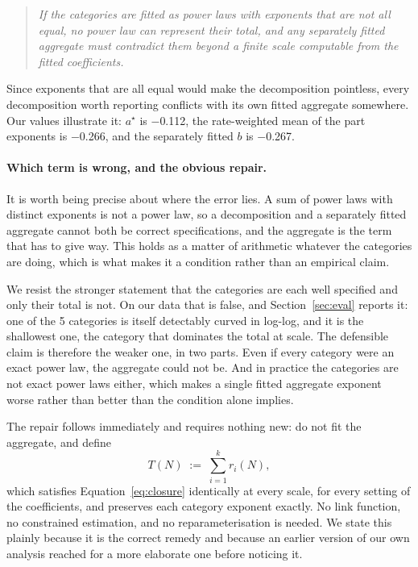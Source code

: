 \documentclass[11pt]{article}
\begin{document}
\begin{quote}
\emph{If the categories are fitted as power laws with exponents that are not all
equal, no power law can represent their total, and any separately fitted aggregate
must contradict them beyond a finite scale computable from the fitted coefficients.}
\end{quote}

Since exponents that are all equal would make the decomposition pointless, every
decomposition worth reporting conflicts with its own fitted aggregate somewhere. Our
values illustrate it: $a^\star$ is $-$0.112, the rate-weighted mean of the
part exponents is $-$0.266, and the separately fitted $b$ is
$-$0.267.

\paragraph{Which term is wrong, and the obvious repair.}
It is worth being precise about where the error lies. A sum of power laws with
distinct exponents is not a power law, so a decomposition and a separately fitted
aggregate cannot both be correct specifications, and the aggregate is the term that
has to give way. This holds as a matter of arithmetic whatever the categories are
doing, which is what makes it a condition rather than an empirical claim.

We resist the stronger statement that the categories are each well specified and
only their total is not. On our data that is false, and Section~\ref{sec:eval}
reports it: one of the 5 categories is itself detectably curved
in log-log, and it is the shallowest one, the category that dominates the total at
scale. The defensible claim is therefore the weaker one, in two parts. Even if every
category were an exact power law, the aggregate could not be. And in practice the
categories are not exact power laws either, which makes a single fitted aggregate
exponent worse rather than better than the condition alone implies.

The repair follows immediately and requires nothing new: do not fit the aggregate,
and define
\begin{equation}
T(N) \;:=\; \sum_{i=1}^{k} r_i(N),
\label{eq:derived}
\end{equation}
which satisfies Equation~\ref{eq:closure} identically at every scale, for every
setting of the coefficients, and preserves each category exponent exactly. No link
function, no constrained estimation, and no reparameterisation is needed. We state
this plainly because it is the correct remedy and because an earlier version of our
own analysis reached for a more elaborate one before noticing it.
\end{document}
